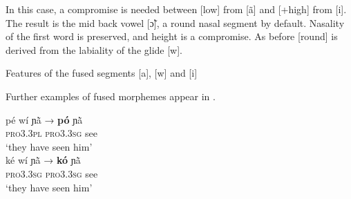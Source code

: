 \documentclass[output=paper]{langscibook}
\begin{document}
In this case, a compromise is needed between [low] from [ã] and [+high] from [i]. The result is the mid back vowel [ɔ̃], a round nasal segment by default. Nasality of the first word is preserved, and height is a compromise. As before [round] is derived from the labiality of the glide [w]. 

\begin{exe}
  \ex Features of the fused segments [a], [w] and [i]\\
 \end{exe}
 
Further examples of fused morphemes appear in . 

\begin{exe}
    \ex \label{ex:traore:38}
        \begin{xlist}
            \ex \gll pé               wí               ɲã̀                 →          \textbf{pó}   ɲã̀\\  
                  \textsc{pro3.3pl}     \textsc{pro3.3sg}    see             {}             {}      {}\\
                  \trans `they have seen him'\\
             \ex \gll ké              wí              ɲã̀                 →          \textbf{kó}    ɲã̀\\
                   \textsc{pro3.3sg}     \textsc{pro3.3sg}    see       {}          {}          {}\\
                \trans `they have seen him'\\
    \end{xlist}
 \end{exe}
\end{document}
